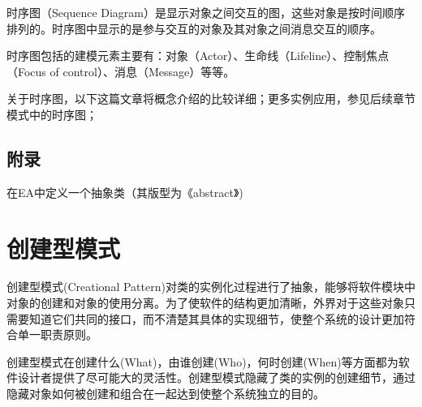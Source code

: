 \documentclass[letterpaper,10pt,english]{sphinxmanual}
\begin{document}
\sphinxAtStartPar
时序图（Sequence Diagram）是显示对象之间交互的图，这些对象是按时间顺序排列的。时序图中显示的是参与交互的对象及其对象之间消息交互的顺序。

\sphinxAtStartPar
时序图包括的建模元素主要有：对象（Actor）、生命线（Lifeline）、控制焦点（Focus of control）、消息（Message）等等。

\sphinxAtStartPar
关于时序图，以下这篇文章将概念介绍的比较详细；更多实例应用，参见后续章节模式中的时序图；

\sphinxAtStartPar
{}


\section{附录}
\label{\detokenize{read_uml:id4}}
\sphinxAtStartPar
在EA中定义一个抽象类（其版型为《abstract》)

\noindent{}

\sphinxstepscope


\chapter{创建型模式}
\label{\detokenize{creational_patterns/creational:creational}}\label{\detokenize{creational_patterns/creational:id1}}\label{\detokenize{creational_patterns/creational::doc}}
\sphinxAtStartPar
创建型模式(Creational Pattern)对类的实例化过程进行了抽象，能够将软件模块中对象的创建和对象的使用分离。为了使软件的结构更加清晰，外界对于这些对象只需要知道它们共同的接口，而不清楚其具体的实现细节，使整个系统的设计更加符合单一职责原则。

\sphinxAtStartPar
创建型模式在创建什么(What)，由谁创建(Who)，何时创建(When)等方面都为软件设计者提供了尽可能大的灵活性。创建型模式隐藏了类的实例的创建细节，通过隐藏对象如何被创建和组合在一起达到使整个系统独立的目的。
\end{document}
